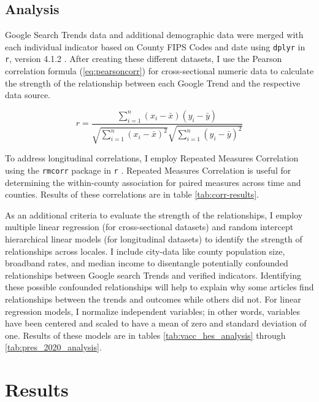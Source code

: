 
\subsection{Analysis}
Google Search Trends data and additional demographic data were merged with each
individual indicator based on County FIPS Codes and date using \texttt{dplyr} in \texttt{r},
version 4.1.2 \citep{tidyverse}. After creating these different datasets, I use the 
Pearson correlation formula (\eqref{eq:pearsoncorr}) for cross-sectional 
numeric data to calculate the strength of the relationship between each Google
Trend and the respective data source.

\begin{equation}
 r =
  \frac{ \sum_{i=1}^{n}(x_i-\bar{x})(y_i-\bar{y}) }{
        \sqrt{\sum_{i=1}^{n}(x_i-\bar{x})^2}\sqrt{\sum_{i=1}^{n}(y_i-\bar{y})^2}} \label{eq:pearsoncorr}
\end{equation}

To address longitudinal correlations, I employ Repeated Measures Correlation
using the \texttt{rmcorr} package in \texttt{r} \citep{bland1995, bakdash2017}. 
Repeated Measures Correlation is useful for determining the within-county
association for paired measures across time and counties. Results of these 
correlations are in table \ref{tab:corr-results}.

As an additional criteria to evaluate the strength of the relationships, 
I employ multiple linear regression
(for cross-sectional datasets) and random intercept hierarchical linear models
\citep{pinheiro_etal21} (for longitudinal datasets) to identify the strength of
relationships across locales. I include city-data like county population size,
broadband rates, and median income to disentangle potentially
confounded relationships between Google search Trends and verified
indicators. Identifying these possible confounded relationships will help to
explain why some articles find relationships between the trends and outcomes
while others did not. For linear regression models, I normalize independent
variables; in other words, variables have been centered and scaled to have a mean of zero and
standard deviation of one. Results of these models are in tables \ref{tab:vacc_hes_analysis} through \ref{tab:pres_2020_analysis}.

\section{Results}

